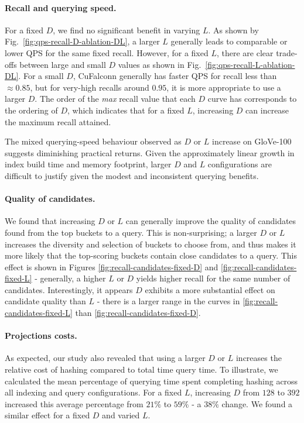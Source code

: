 \documentclass{article}
\newcommand{\cf}{CuFalconn\xspace}
\newcommand{\glv}{GloVe-100\xspace}
\begin{document}
\paragraph{Recall and querying speed.} For a fixed $D$, we find no significant benefit in varying $L$. As shown by Fig.~\ref{fig:qps-recall-D-ablation-DL}, a larger $L$ generally leads to comparable or lower QPS for the same fixed recall. However, for a fixed $L$, there are clear trade-offs between large and small $D$ values as shown in Fig.~\ref{fig:qps-recall-L-ablation-DL}. For a small $D$, \cf generally has faster QPS for recall less than $\approx 0.85$, but for very-high recalls around $0.95$, it is more appropriate to use a larger $D$. The order of the \emph{max} recall value that each $D$ curve has corresponds to the ordering of $D$, which indicates that for a fixed $L$, increasing $D$ can increase the maximum recall attained. 

The mixed querying-speed behaviour observed as $D$ or $L$ increase on \glv suggests diminishing practical returns. Given the approximately linear growth in index build time and memory footprint, larger $D$ and $L$ configurations are difficult to justify given the modest and inconsistent querying benefits.

\paragraph{Quality of candidates.} We found that increasing $D$ or $L$ can generally improve the quality of candidates found from the top buckets to a query. This is non-surprising; a larger $D$ or $L$ increases the diversity and selection of buckets to choose from, and thus makes it more likely that the top-scoring buckets contain close candidates to a query. This effect is shown in Figures \ref{fig:recall-candidates-fixed-D} and \ref{fig:recall-candidates-fixed-L} - generally, a higher $L$ or $D$ yields higher recall for the same number of candidates. Interestingly, it appears $D$ exhibits a more substantial effect on candidate quality than $L$ - there is a larger range in the curves in \ref{fig:recall-candidates-fixed-L} than \ref{fig:recall-candidates-fixed-D}. 

\paragraph{Projections costs.} As expected, our study also revealed that using a larger $D$ or $L$ increases the relative cost of hashing compared to total time query time. To illustrate, we calculated the mean percentage of querying time spent completing hashing across all indexing and query configurations. For a fixed $L$, increasing $D$ from $128$ to $392$ increased this average percentage from $21\%$ to $59\%$ - a $38\%$ change. We found a similar effect for a fixed $D$ and varied $L$.
\end{document}
